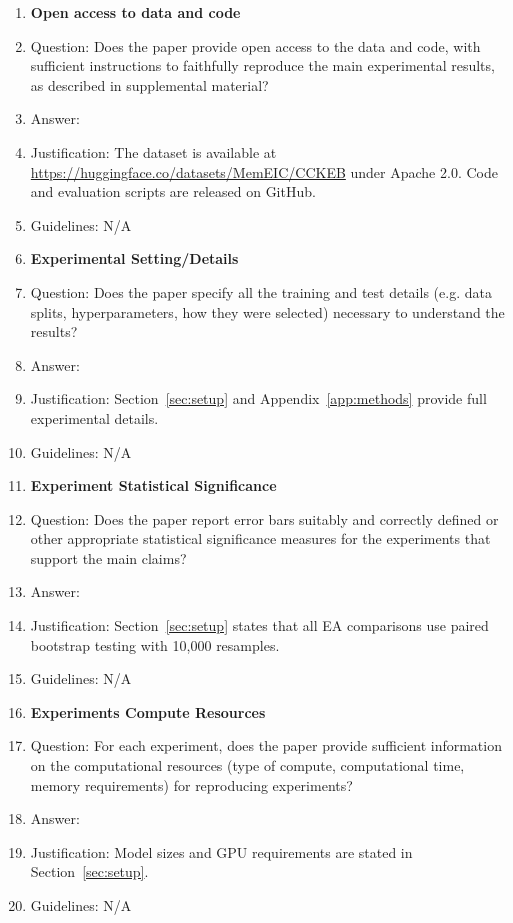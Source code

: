 \begin{enumerate}
\item {\bf Open access to data and code}
\item[] Question: Does the paper provide open access to the data and code, with sufficient instructions to faithfully reproduce the main experimental results, as described in supplemental material?
\item[] Answer: \answerYes{}
\item[] Justification: The dataset is available at \url{https://huggingface.co/datasets/MemEIC/CCKEB} under Apache 2.0. Code and evaluation scripts are released on GitHub.
\item[] Guidelines: N/A

\item {\bf Experimental Setting/Details}
\item[] Question: Does the paper specify all the training and test details (e.g. data splits, hyperparameters, how they were selected) necessary to understand the results?
\item[] Answer: \answerYes{}
\item[] Justification: Section~\ref{sec:setup} and Appendix~\ref{app:methods} provide full experimental details.
\item[] Guidelines: N/A

\item {\bf Experiment Statistical Significance}
\item[] Question: Does the paper report error bars suitably and correctly defined or other appropriate statistical significance measures for the experiments that support the main claims?
\item[] Answer: \answerYes{}
\item[] Justification: Section~\ref{sec:setup} states that all EA comparisons use paired bootstrap testing with 10{,}000 resamples.
\item[] Guidelines: N/A

\item {\bf Experiments Compute Resources}
\item[] Question: For each experiment, does the paper provide sufficient information on the computational resources (type of compute, computational time, memory requirements) for reproducing experiments?
\item[] Answer: \answerYes{}
\item[] Justification: Model sizes and GPU requirements are stated in Section~\ref{sec:setup}.
\item[] Guidelines: N/A


\end{enumerate}
